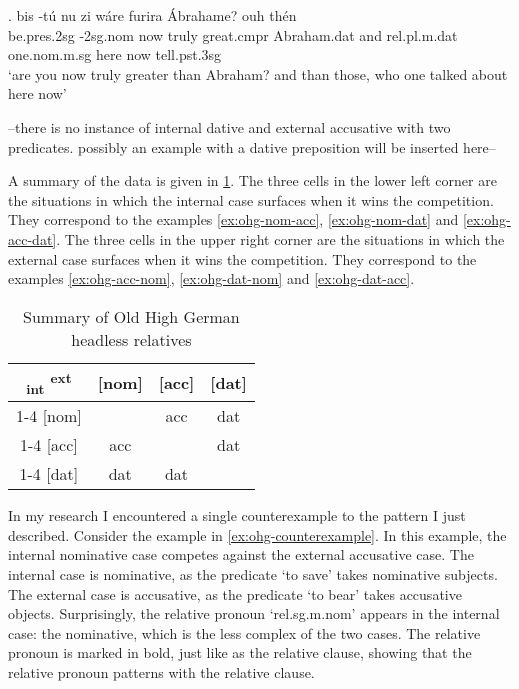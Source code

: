 \exg. bis -tú nu {zi wáre} furira Ábrahame? ouh thén    \\
be.\ac{pres}.2\ac{sg} -2\ac{sg}.\ac{nom} now truly {great}.\ac{cmpr}\scsub{[dat]} Abraham.\ac{dat} and \ac{rel}.\ac{pl}.\ac{m}.\ac{dat} one.\ac{nom}.\ac{m}.\ac{sg} here now tell.\ac{pst}.3\ac{sg}\scsub{[acc]}\\
`are you now truly greater than Abraham? and than those, who one talked about here now' \label{ex:ohg-dat-acc}

--there is no instance of internal dative and external accusative with two predicates. possibly an example with a dative preposition will be inserted here--

A summary of the data is given in \ref{tbl:summary-old-high-german}.
The three cells in the lower left corner are the situations in which the internal case surfaces when it wins the competition. They correspond to the examples \ref{ex:ohg-nom-acc}, \ref{ex:ohg-nom-dat} and \ref{ex:ohg-acc-dat}.
The three cells in the upper right corner are the situations in which the external case surfaces when it wins the competition. They correspond to the examples \ref{ex:ohg-acc-nom}, \ref{ex:ohg-dat-nom} and \ref{ex:ohg-dat-acc}.

\begin{table}[H]
  \center
  \caption{Summary of Old High German headless relatives}
  \begin{tabular}{c|c|c|c}
    \toprule
        \textsubscript{\ac{int}} \textsuperscript{\ac{ext}}
          & [\ac{nom}]
          & [\ac{acc}]
          & [\ac{dat}]
          \\ \cmidrule{1-4}
      [\ac{nom}]
          &
          & \ac{acc}
          & \ac{dat}
          \\ \cmidrule{1-4}
      [\ac{acc}]
          & \ac{acc}
          &
          & \ac{dat}
          \\ \cmidrule{1-4}
      [\ac{dat}]
          & \ac{dat}
          & \ac{dat}
          &
          \\
    \bottomrule
  \end{tabular}
    \label{tbl:summary-old-high-german}
\end{table}

In my research I encountered a single counterexample to the pattern I just described.
Consider the example in \ref{ex:ohg-counterexample}. In this example, the internal nominative case competes against the external accusative case.
The internal case is nominative, as the predicate  `to save' takes nominative subjects.
The external case is accusative, as the predicate  `to bear' takes accusative objects.
Surprisingly, the relative pronoun  `\ac{rel}.\ac{sg}.\ac{m}.\ac{nom}' appears in the internal case: the nominative, which is the less complex of the two cases. The relative pronoun is marked in bold, just like as the relative clause, showing that the relative pronoun patterns with the relative clause.


